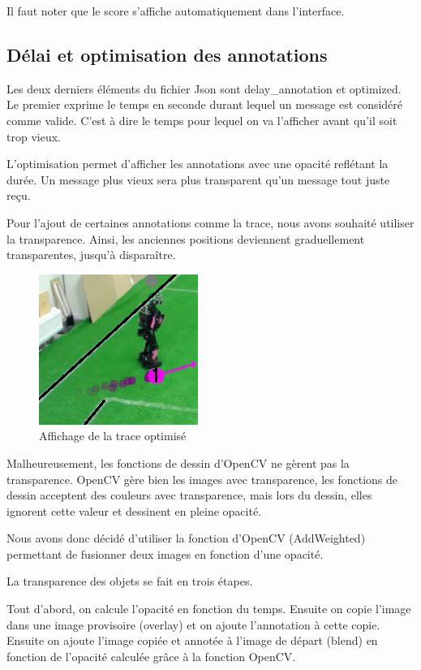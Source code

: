 Il faut noter que le score s'affiche automatiquement dans l'interface.

\subsection{Délai et optimisation des annotations}

Les deux derniers éléments du fichier Json sont delay\_annotation et optimized. Le premier exprime le temps en seconde durant lequel un message est considéré comme valide. C'est à dire le temps pour lequel on va l'afficher avant qu'il soit trop vieux.
\bigskip

L'optimisation permet d'afficher les annotations avec une opacité reflétant la durée. Un message plus vieux sera plus transparent qu'un message tout juste reçu. 
\bigskip

Pour l'ajout de certaines annotations comme la trace, nous avons souhaité utiliser la transparence.
Ainsi, les anciennes positions deviennent graduellement transparentes, jusqu'à disparaître.


\begin{figure}[h] 
\centering 
\includegraphics[scale = 0.5]{images/traceoptimized.png}
    \caption{Affichage de la trace optimisé}
    \label{fig:trace_opti}
\end{figure}


Malheureusement, les fonctions de dessin d'OpenCV ne gèrent pas la transparence.
OpenCV gère bien les images avec transparence, les fonctions de dessin acceptent des couleurs avec transparence, mais lors du dessin, elles ignorent cette valeur et dessinent en pleine opacité. 
\bigskip

Nous avons donc décidé d'utiliser la fonction d'OpenCV (AddWeighted) permettant de fusionner deux images en fonction d'une opacité.
\bigskip

La transparence des objets se fait en trois étapes.

Tout d'abord, on calcule l'opacité en fonction du temps. Ensuite on copie l'image dans une image provisoire (overlay) et on ajoute l'annotation à cette copie. Ensuite on ajoute l'image copiée et annotée à l'image de départ (blend) en fonction de l'opacité calculée grâce à la fonction OpenCV. 
\bigskip

